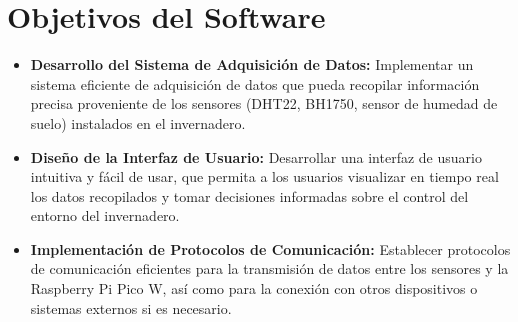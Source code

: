 \section{Objetivos del Software}
\begin{itemize}
\item \textbf{Desarrollo del Sistema de Adquisición de Datos:}
Implementar un sistema eficiente de adquisición de datos que pueda recopilar información precisa proveniente de los sensores (DHT22, BH1750, sensor de humedad de suelo) instalados en el invernadero.
\item \textbf{Diseño de la Interfaz de Usuario:}
Desarrollar una interfaz de usuario intuitiva y fácil de usar, que permita a los usuarios visualizar en tiempo real los datos recopilados y tomar decisiones informadas sobre el control del entorno del invernadero.
\item \textbf{Implementación de Protocolos de Comunicación:}
Establecer protocolos de comunicación eficientes para la transmisión de datos entre los sensores y la Raspberry Pi Pico W, así como para la conexión con otros dispositivos o sistemas externos si es necesario.
\end{itemize}
\pagebreak

